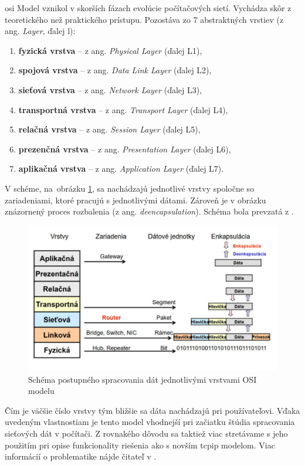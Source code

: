 \acrshort{osi} Model vznikol v skorších fázach evolúcie počítačových sietí. Vychádza skôr z teoretického než praktického prístupu. Pozostáva zo 7 abstraktných vrstiev (z ang. \textit{Layer}, ďalej \acrshort{l}):

\begin{enumerate}
	\item{\textbf{fyzická vrstva}} -- z ang. \textit{Physical Layer} (ďalej L1),
	\item{\textbf{spojová vrstva}} -- z ang. \textit{Data Link Layer} (ďalej L2), 
	\item{\textbf{sieťová vrstva}} -- z ang. \textit{Network Layer} (ďalej L3), 
	\item{\textbf{transportná vrstva}} -- z ang. \textit{Transport Layer} (ďalej L4), 
	\item{\textbf{relačná vrstva}} -- z ang. \textit{Session Layer} (ďalej L5), 
	\item{\textbf{prezenčná vrstva}} -- z ang. \textit{Presentation Layer} (ďalej L6), 
	\item{\textbf{aplikačná vrstva}} -- z ang. \textit{Application Layer} (ďalej L7). 
\end{enumerate}
V schéme, na~obrázku \ref{p2}, sa nachádzajú jednotlivé vrstvy spoločne so zariadeniami, ktoré pracujú s jednotlivými dátami. Zároveň je v obrázku znázornený proces rozbalenia (z ang. \textit{deencapsulation}). Schéma bola prevzatá z \cite{biks}.

\begin{figure}[h!]
	\centering
	\includegraphics[width=0.9\linewidth]{figures/prenos2z2}
	\caption{Schéma postupného spracovania dát jednotlivými vrstvami OSI modelu \cite{biks}}
	\label{p2}
\end{figure}

Čím je väčšie číslo vrstvy tým bližšie sa dáta nachádzajú pri používateľovi. Vďaka uvedeným vlastnostiam je tento model vhodnejší pri začiatku štúdia spracovania sieťových dát v počítači. Z rovnakého dôvodu sa taktiež viac stretávame s jeho použitím pri opise funkcionality riešenia ako s novším \acrshort{tcpip} modelom.  Viac informácií o problematike nájde čitateľ v \cite{osi}.

